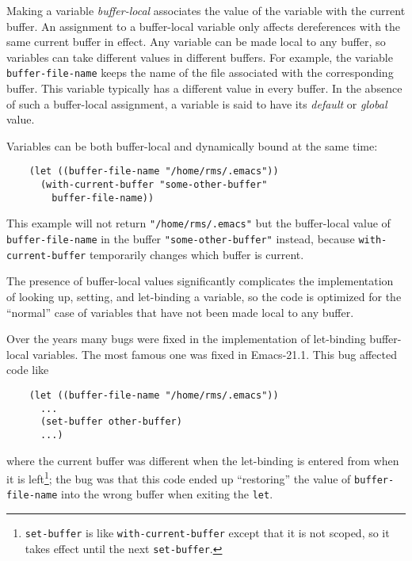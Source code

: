 \documentclass[format=acmsmall, review]{acmart}
\begin{document}
Making a variable \emph{buffer-local} associates the value of the variable
with the current buffer.  An assignment to a buffer-local variable
only affects dereferences with the same current buffer in effect.
Any variable can be made local to any buffer, so variables can take
different values in different buffers.  For example, the variable
\texttt{buffer-file-name} keeps the name of the file associated with the
corresponding buffer.  This variable typically has a different value in
every buffer.  In the absence of such a buffer-local assignment, a variable
is said to have its \emph{default} or \emph{global} value.

Variables can be both buffer-local and dynamically bound at the same time:
\begin{verbatim}
    (let ((buffer-file-name "/home/rms/.emacs"))
      (with-current-buffer "some-other-buffer"
        buffer-file-name))
\end{verbatim}
This example will not return \texttt{"/home/rms/.emacs"} but the
buffer-local value of \texttt{buffer-file-name} in the buffer
\texttt{"some-other-buffer"} instead, because \texttt{with-current-buffer}
temporarily changes which buffer is current.

The presence of buffer-local values significantly complicates the
implementation of looking up, setting, and let-binding a variable, so the
code is optimized for the ``normal'' case of variables that have not been
made local to any buffer.

Over the years many bugs were fixed in the implementation of let-binding
buffer-local variables.  The most famous one was fixed in Emacs-21.1.
This bug affected code like
\begin{verbatim}
    (let ((buffer-file-name "/home/rms/.emacs"))
      ...
      (set-buffer other-buffer)
      ...)
\end{verbatim}
where the current buffer was different when the let-binding is entered from
when it is left\footnote{\texttt{set-buffer} is like
  \texttt{with-current-buffer} except that it is not scoped, so it takes
  effect until the next \texttt{set-buffer}.}; the bug was that this code
ended up ``restoring'' the value of \texttt{buffer-file-name} into the
wrong buffer when exiting the \texttt{let}.
\end{document}
